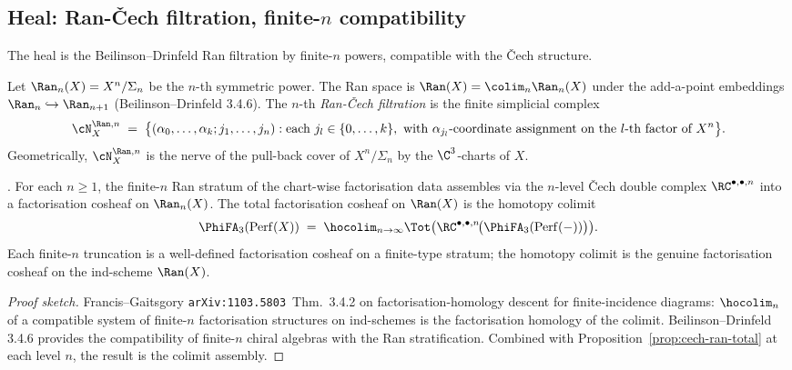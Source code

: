 \subsection*{Heal: Ran-Čech filtration, finite-$n$ compatibility}

The heal is the Beilinson--Drinfeld Ran filtration by finite-$n$ powers,
compatible with the Čech structure.

\begin{definition}
\label{def:ran-cech-n-filtration}
Let $\Ran_n(X) = X^n / \Sigma_n$ be the $n$-th symmetric power.
The Ran space is $\Ran(X) = \colim_n \Ran_n(X)$ under the
add-a-point embeddings $\Ran_n \hookrightarrow \Ran_{n+1}$
(Beilinson--Drinfeld 3.4.6). The $n$-th \emph{Ran-Čech filtration} is
the finite simplicial complex
\[
  \cN_X^{\Ran, n} \;=\;
  \bigl\{ (\alpha_0, \ldots, \alpha_k; j_1, \ldots, j_n) :
  \text{each } j_l \in \{0, \ldots, k\},
  \text{ with } \alpha_{j_l}\text{-coordinate assignment on the
  $l$-th factor of } X^n \bigr\}.
\]
Geometrically, $\cN_X^{\Ran, n}$ is the nerve of the pull-back cover
of $X^n / \Sigma_n$ by the $\C^3$-charts of $X$.
\end{definition}

\begin{theorem}
\label{thm:ran-cech-filtration}
\textup{\ClaimStatusProposition.}
For each $n \geq 1$, the finite-$n$ Ran stratum of the chart-wise
factorisation data assembles via the $n$-level Čech double complex
$\RC^{\bullet, \bullet, n}$ into a factorisation cosheaf on
$\Ran_n(X)$. The total factorisation cosheaf on $\Ran(X)$ is the
homotopy colimit
\[
  \PhiFA_3(\mathrm{Perf}(X)) \;=\;
  \hocolim_{n \to \infty} \Tot\bigl(
  \RC^{\bullet, \bullet, n}\!\bigl(\PhiFA_3(\mathrm{Perf}(-))\bigr)
  \bigr).
\]
Each finite-$n$ truncation is a well-defined factorisation cosheaf on
a finite-type stratum; the homotopy colimit is the genuine
factorisation cosheaf on the ind-scheme $\Ran(X)$.
\end{theorem}

\begin{proof}[Proof sketch]
Francis--Gaitsgory \texttt{arXiv:1103.5803}~Thm.~3.4.2 on
factorisation-homology descent for finite-incidence diagrams:
$\hocolim_n$ of a compatible system of finite-$n$ factorisation
structures on ind-schemes is the factorisation homology of the
colimit. Beilinson--Drinfeld 3.4.6 provides the compatibility of
finite-$n$ chiral algebras with the Ran stratification. Combined
with Proposition~\ref{prop:cech-ran-total} at each level $n$, the
result is the colimit assembly.
\end{proof}


